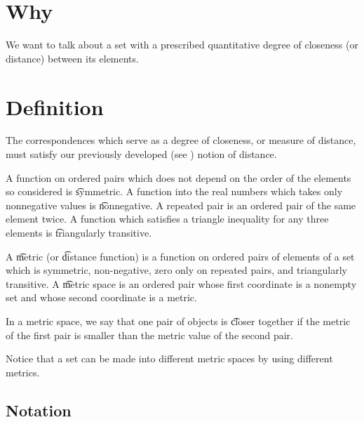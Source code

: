 

\section*{Why}

We want to talk about a set with a prescribed quantitative degree of closeness (or distance) between its elements.

\section*{Definition}

The correspondences which serve as a degree of closeness, or measure of distance, must satisfy our previously developed (see ) notion of distance.

A function on ordered pairs which does not depend on the order of the elements so considered is \t{symmetric}.
A function into the real numbers which takes only nonnegative values is \t{nonnegative}.
A repeated pair is an ordered pair of the same element twice.
A function which satisfies a triangle inequality for any three elements is \t{triangularly transitive}.

A \t{metric} (or \t{distance function}) is a function on ordered pairs of elements of a set which is symmetric, non-negative, zero only on repeated pairs, and triangularly transitive.
A \t{metric space} is an ordered pair whose first coordinate is a nonempty set and whose second coordinate is a metric.

In a metric space, we say that one pair of objects is \t{closer} together if the metric of the first pair is smaller than the metric value of the second pair.

Notice that a set can be made into different metric spaces by using different metrics.

\subsection*{Notation}

